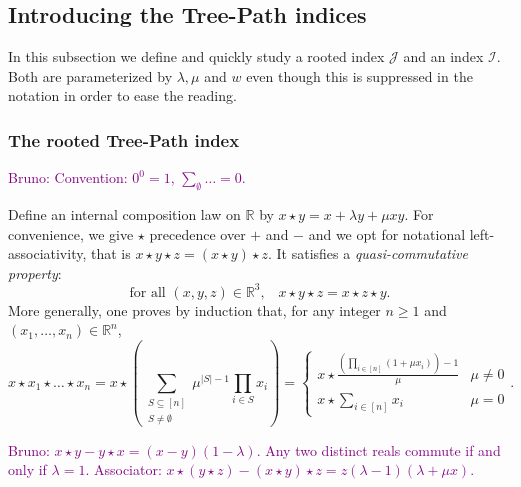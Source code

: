 \documentclass[11 pt]{modarticle}
\newcommand{\cR}{\mathbb{R}}
\newcommand{\wmap}{w}
\newcommand{\indexsymbol}{\mathcal{I}}
\newcommand{\rindexsymbol}{\mathcal{J}}
\newcommand{\bldcomment}[1]{\textcolor{purple}{{\footnotesize Bruno:} #1}}
\begin{document}
\subsection{Introducing the Tree-Path indices}

In this subsection we define and quickly study a rooted index $\rindexsymbol$ and an index $\indexsymbol$. Both are parameterized by $\lambda, \mu$ and $\wmap$ even though this is suppressed in the notation in order to ease the reading.

\subsubsection{The rooted Tree-Path index}
\bldcomment{Convention: $0^0=1$, $\sum_\emptyset \dots = 0$.}

Define an internal composition law on $\cR$ by $x \star y =  x + \lambda y + \mu x y$. For convenience, we give $\star$ precedence over $+$ and $-$ and we opt for notational left-associativity, that is $x\star y \star z = (x \star y) \star z$.  It satisfies a \emph{quasi-commutative property}: 
\begin{equation}
   \text{for all $(x,y,z)\in\cR^3$,}\quad x \star y \star z = x \star z \star y.\label{eq:commutativity}
\end{equation}  
More generally, one proves by induction that, for any integer $n \geq 1$ and $(x_1,\dots,x_n)\in \cR^n$,
\[ x \star x_1 \star \dots \star x_n = x \star \left(\sum_{\substack{S \subseteq [n]\\S\neq \emptyset}} \mu^{|S|-1} \prod_{i\in S} x_i \right)
= \begin{cases} x \star \frac{ \left( \prod_{i\in [n]} (1 + \mu x_i) \right)- 1}{\mu}  & \mu \neq 0\\
x \star  \sum_{i\in [n]} x_i  & \mu = 0 \end{cases}.
\]




\bldcomment{$x \star y - y \star x = (x - y)(1 - \lambda)$.  Any two distinct reals commute if and only if $\lambda=1$. Associator: $x \star(y\star z) - (x\star y) \star z = z (\lambda - 1)(\lambda + \mu x)$.}
\end{document}

